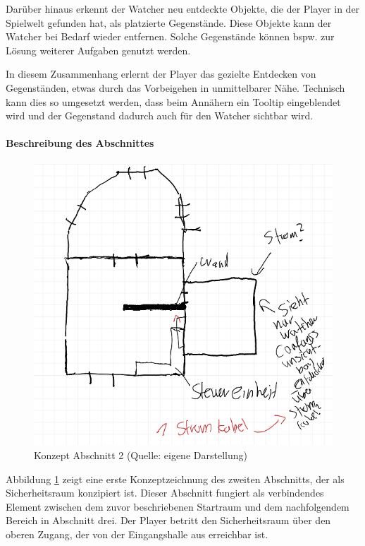 Darüber hinaus erkennt der Watcher neu entdeckte Objekte, die der Player in der Spielwelt gefunden hat, als platzierte Gegenstände. Diese Objekte kann der Watcher bei Bedarf wieder entfernen. Solche Gegenstände können bspw. zur Lösung weiterer Aufgaben genutzt werden.

In diesem Zusammenhang erlernt der Player das gezielte Entdecken von Gegenständen, etwas durch das Vorbeigehen in unmittelbarer Nähe. Technisch kann dies so umgesetzt werden, dass beim Annähern ein Tooltip eingeblendet wird und der Gegenstand dadurch auch für den Watcher sichtbar wird.

\paragraph{Beschreibung des Abschnittes}

\begin{figure}[ht]
\centering
\includegraphics[width=1\linewidth]{content/pictures/Abschnitt_Concept_01.PNG}
\caption{Konzept Abschnitt 2 (Quelle: eigene Darstellung)}
\label{fig:section_01_concept}
\end{figure}

Abbildung \ref{fig:section_01_concept} zeigt eine erste Konzeptzeichnung des zweiten Abschnitts, der als Sicherheitsraum konzipiert ist. Dieser Abschnitt fungiert als verbindendes Element zwischen dem zuvor beschriebenen Startraum und dem nachfolgendem Bereich in Abschnitt drei. Der Player betritt den Sicherheitsraum über den oberen Zugang, der von der Eingangshalle aus erreichbar ist.

